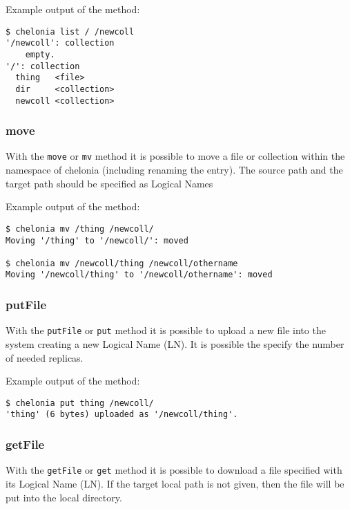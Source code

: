 Example output of the method:
\begin{verbatim}
$ chelonia list / /newcoll
'/newcoll': collection
    empty.
'/': collection
  thing   <file>
  dir     <collection>
  newcoll <collection>
\end{verbatim}

\subsubsection{move} %
\label{ssub:move}
With the \texttt{move} or \texttt{mv} method it is possible to move a file or collection within the namespace of chelonia (including renaming the entry). The source path and the target path should be specified as Logical Names
\hspace*{0.5cm}
\begin{shaded}
\end{shaded}

Example output of the method:
\begin{verbatim}
$ chelonia mv /thing /newcoll/
Moving '/thing' to '/newcoll/': moved 

$ chelonia mv /newcoll/thing /newcoll/othername
Moving '/newcoll/thing' to '/newcoll/othername': moved   
\end{verbatim}

\subsubsection{putFile} %
\label{ssub:putfile}
With the \texttt{putFile} or \texttt{put} method it is possible to upload a new file into the system creating a new Logical Name (LN). It is possible the specify the number of needed replicas.
\hspace*{0.5cm}
\begin{shaded}
\end{shaded}

Example output of the method:
\begin{verbatim}
$ chelonia put thing /newcoll/
'thing' (6 bytes) uploaded as '/newcoll/thing'.    
\end{verbatim}

\subsubsection{getFile} %
\label{ssub:getfile}
With the \texttt{getFile} or \texttt{get} method it is possible to download a file specified with its Logical Name (LN). If the target local path is not given, then the file will be put into the local directory.
\hspace*{0.5cm}
\begin{shaded}
\end{shaded}

